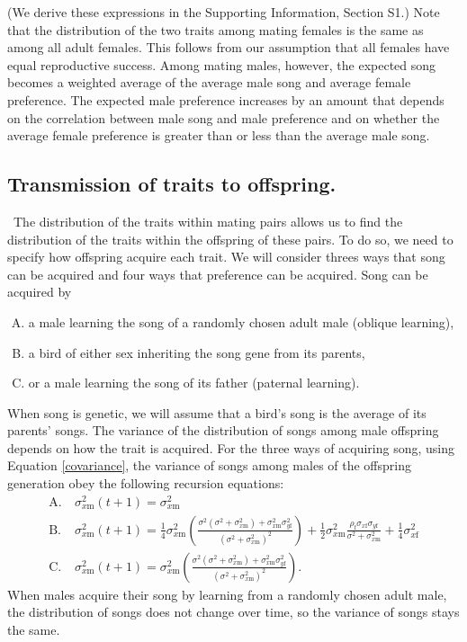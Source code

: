 \documentclass[12pt]{article}
\newcommand{\x}[1]{\text{#1}}
\begin{document}
(We derive these expressions in the Supporting Information, Section S1.) Note that the distribution of the two traits among mating females is the same as among all adult females. This follows from our assumption that all females have equal reproductive success. Among mating males, however, the expected song becomes a weighted average of the average male song and average female preference. The expected male preference increases by an amount that depends on the correlation between male song and male preference and on whether the average female preference is greater than or less than the average male song.

\subsection*{Transmission of traits to offspring.  } 
\ The distribution of the traits within mating pairs allows us to find the distribution of the traits within the offspring of these pairs. To do so, we need to specify how offspring acquire each trait. We will consider threes ways that song can be acquired and four ways that preference can be acquired. Song can be acquired by 
\begin{enumerate}[A.]
\item a male learning the song of a randomly chosen adult male (oblique learning),
\item a bird of either sex inheriting the song gene from its parents, 
\item or a male learning the song of its father (paternal learning).
\end{enumerate}
When song is genetic, we will assume that a bird's song is the average of its parents' songs. 
The variance of the distribution of songs among male offspring depends on how the trait is acquired. For the three ways of acquiring song, using Equation \ref{covariance}, the variance of songs among males of the offspring generation obey the following recursion equations: 
\begin{align*}
\x{A.} \ &\sigma_{x\x{m}}^2(t+1)=\sigma_{x\x{m}}^2
\\ \x{B.} \ &\sigma_{x\x{m}}^2(t+1)=\frac{1}{4}\sigma_{x\x{m}}^2\left(\frac{\sigma^2(\sigma^2+\sigma_{x\x{m}}^2)+\sigma_{ x\x{m}}^2\sigma_{y\x{f}}^2}{(\sigma^2+\sigma_{x\x{m}}^2)^2}\right)+\frac{1}{2}\sigma_{x\x{m}}^2\frac{\rho_\x{f}\sigma_{x\x{f}}\sigma_{y\x{f}}}{\sigma^2+\sigma_{x\x{m}}^2}+\frac{1}{4}\sigma_{x\x{f}}^2
\\\x{C.} \ &\sigma_{x\x{m}}^2(t+1)=\sigma_{x\x{m}}^2\left(\frac{\sigma^2(\sigma^2+\sigma_{x\x{m}}^2)+\sigma_{ x\x{m}}^2\sigma_{y\x{f}}^2}{(\sigma^2+\sigma_{x\x{m}}^2)^2}\right).
\end{align*}
When males acquire their song by learning from a randomly chosen adult male, the distribution of songs does not change over time, so the variance of songs stays the same. 
\end{document}
